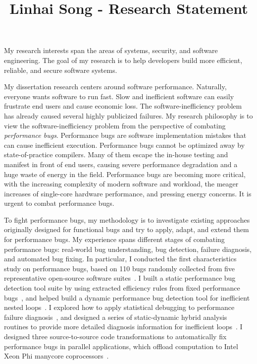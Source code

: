 \documentclass[10pt]{article}
\title{\vspace{-.7in}\bf{Linhai Song - Research Statement\vspace{-.4in}}}
\date{}
\begin{document}
\maketitle\vspace{-.2in}

My research interests span the areas of systems, security, and software engineering.
The goal of my research is to help developers build more efficient, reliable, and secure software systems.

My dissertation research centers around software performance. 
Naturally, everyone wants software to run fast. 
Slow and inefficient software can easily frustrate end users and cause economic loss. 
The software-inefficiency problem has already caused several highly publicized failures. 
My research philosophy is to view the software-inefficiency problem from the perspective of combating \textit{performance bugs}.
Performance bugs are software implementation mistakes that can cause inefficient execution. 
Performance bugs cannot be optimized away by state-of-practice compilers.
Many of them escape the in-house testing and manifest in front of end users, 
causing severe performance degradation and a huge waste of energy in the field. 
Performance bugs are becoming more critical, with the increasing complexity of modern software and workload, 
the meager increases of single-core hardware performance, 
and pressing energy concerns. 
It is urgent to combat performance bugs.

To fight performance bugs, my methodology is to investigate existing approaches originally
designed for functional bugs and try to apply, adapt, and extend them for performance bugs.
My experience spans different
stages of combating performance bugs: 
real-world bug understanding, bug detection,
failure diagnosis, and automated bug fixing.
In particular, 
I conducted the first characteristics study on performance bugs, 
based on 110 bugs randomly collected from five representative open-source software suites~\cite{jin12perfbug}.
I built a static performance bug detection tool suite by using extracted efficiency rules from fixed performance bugs~\cite{jin12perfbug}, 
and helped build a dynamic performance bug detection tool for inefficient nested loops~\cite{Nistor13ICSE}. 
I explored how to apply statistical debugging to performance failure diagnosis~\cite{Song14OOPSLA}, 
and designed a series of static-dynamic hybrid analysis routines to provide more detailed diagnosis information for inefficient loops~\cite{Song17ICSE}.
I designed three source-to-source code transformations to automatically fix performance bugs in parallel applications, 
which offload computation to Intel Xeon Phi manycore coprocessors~\cite{Song14MICRO}.  
\end{document}
